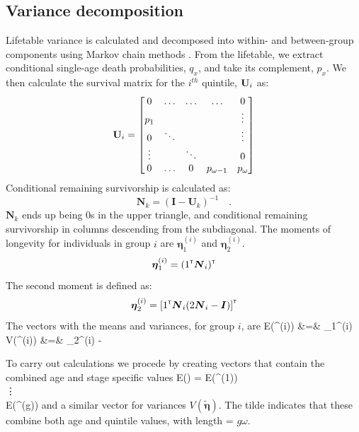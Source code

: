 \documentclass[12pt,oneside,a4paper]{article} %
\theoremstyle{definition}
\begin{document}
\subsection{Variance decomposition}
Lifetable variance is calculated and decomposed into within- and between-group
components using Markov chain methods \citep{Caswell2001}\citep{Caswell2009}\citep{Caswell2014}. From the lifetable, we extract
conditional single-age death probabilities, $q_x$, and take its complement,
$p_x$. We then calculate the survival matrix for the $i^{th}$
quintile, ${\bf U}_i$ as:
\begin{equation}
{\bf U}_i = 
\begin{bmatrix}
    0     & \hdots  & \hdots &  \hdots  & 0 \\
    p_{1} &   &    &    &  \vdots \\
    0 & \ddots &   &   & \vdots \\
    \vdots & & \ddots & & 0\\
   0 &  \hdots & 0 & p_{\omega-1}  & p_{\omega}
\end{bmatrix}
\end{equation}
Conditional remaining survivorship is calculated as:
\begin{equation}
\mathbf{N}_k = (\mathbf{I} - \mathbf{U}_k )^{-1} \quad .
\end{equation}
$\mathbf{N}_k$ ends up being 0s in the upper triangle, and conditional remaining
survivorship in columns descending from the subdiagonal. The moments of longevity for individuals in group $i$ are $\bm \eta_1^{(i)}$ and $\bm \eta_2^{(i)}$. 
\begin{equation}
\mbox{\boldmath $\eta$}_1^{(i)} = (1^{\mbox{\tiny \sf T}} \mbox{\boldmath $N$}_i)^{\mbox{\tiny \sf T}}
\end{equation}
The second moment is defined as:
\begin{equation}
\mbox{\boldmath $\eta$}_2^{(i)} = \left[ 1^{\mbox{\tiny \sf T}} \mbox{\boldmath $N$}_i (2 \mbox{\boldmath $N$}_i - \mbox{\boldmath $I$})\right]^{\mbox{\tiny \sf T}}
\end{equation}
The vectors with the means and variances, for group $i$, are
\bea
E(\bm \eta^{(i)}) &=& \bm \eta_1^{(i)} \\
V(\bm \eta^{(i)}) &=& \bm \eta_2^{(i)} - 
\eea

To carry out calculations we procede by creating vectors that contain the
combined age and stage specific values
\bea
E(\tilde{\bm \eta}) = 
E(\bm \eta^{(1)}) \\
\vdots\\
E(\bm \eta^{(g)})
\emat
\eea
and a similar vector for variances $V(\tilde{\bm \eta})$. The tilde indicates
that these combine both age and quintile values, with length = $g \omega$.
\end{document}
